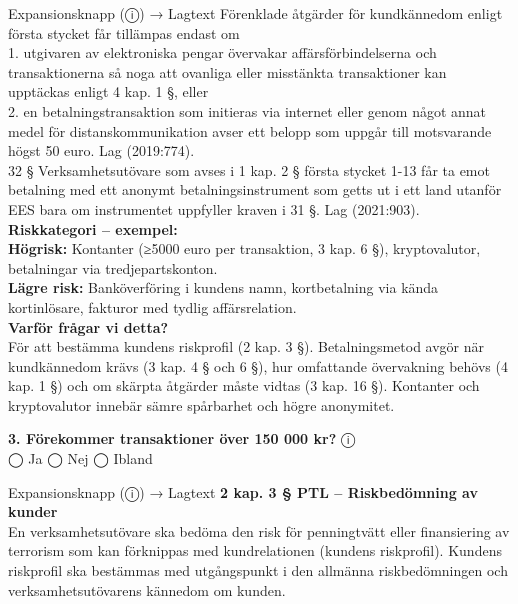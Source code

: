 \documentclass[10pt]{beamer}
\begin{document}
\begin{frame}[label=riskfragor-steg3]
\begin{alertblock}{Expansionsknapp (ⓘ) → Lagtext}
    Förenklade åtgärder för kundkännedom enligt första stycket får tillämpas endast om\\
    1. utgivaren av elektroniska pengar övervakar affärsförbindelserna och transaktionerna 
    så noga att ovanliga eller misstänkta transaktioner kan upptäckas enligt 4 kap. 1 §, eller\\
    2. en betalningstransaktion som initieras via internet eller genom något annat medel för distanskommunikation avser ett belopp som uppgår till motsvarande högst 50 euro.
    Lag (2019:774).\\

    32 §   Verksamhetsutövare som avses i 1 kap. 2 § första stycket 1-13 får ta emot betalning med 
    ett anonymt betalningsinstrument som getts ut i ett land utanför EES bara om instrumentet 
    uppfyller kraven i 31 §. Lag (2021:903).\\[0.1cm]

    \tiny \textbf{Riskkategori – exempel:}\\
    \tiny \textbf{Högrisk:} Kontanter (≥5000 euro per transaktion, 3 kap. 6 §), kryptovalutor, betalningar via tredjepartskonton.\\
    \tiny \textbf{Lägre risk:} Banköverföring i kundens namn, kortbetalning via kända kortinlösare, fakturor med tydlig affärsrelation.\\[0.1cm]
    \tiny \textbf{Varför frågar vi detta?}\\
    \tiny För att bestämma kundens riskprofil (2 kap. 3 §). Betalningsmetod avgör när kundkännedom krävs (3 kap. 4 § och 6 §), hur omfattande övervakning behövs (4 kap. 1 §) och om skärpta åtgärder måste vidtas (3 kap. 16 §). Kontanter och kryptovalutor innebär sämre spårbarhet och högre anonymitet.
  \end{alertblock}

  \vspace{0.3cm}

  \textbf{3. Förekommer transaktioner över 150 000 kr?} \hspace{0.3cm} ⓘ\\
  ◯ Ja \hspace{0.3cm} ◯ Nej \hspace{0.3cm} ◯ Ibland
  \begin{alertblock}{Expansionsknapp (ⓘ) → Lagtext}
    \tiny \textbf{2 kap. 3 § PTL – Riskbedömning av kunder}\\
    \tiny En verksamhetsutövare ska bedöma den risk för penningtvätt eller finansiering av terrorism som kan
    förknippas med kundrelationen (kundens riskprofil). Kundens riskprofil ska bestämmas med utgångspunkt 
    i den allmänna riskbedömningen och verksamhetsutövarens kännedom om kunden.\\


\end{alertblock}
\end{frame}
\end{document}
